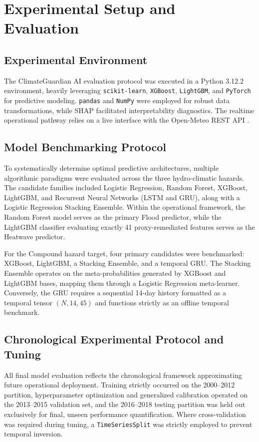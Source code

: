 \section{Experimental Setup and Evaluation}
\label{sec:experimental}

\subsection{Experimental Environment}
The ClimateGuardian AI evaluation protocol was executed in a Python 3.12.2 environment, heavily leveraging \texttt{scikit-learn}, \texttt{XGBoost}, \texttt{LightGBM}, and \texttt{PyTorch} for predictive modeling. \texttt{pandas} and \texttt{NumPy} were employed for robust data transformations, while SHAP \cite{Lundberg2017} facilitated interpretability diagnostics. The realtime operational pathway relies on a live interface with the Open-Meteo REST API \cite{OpenMeteo2023}.

\subsection{Model Benchmarking Protocol}
To systematically determine optimal predictive architectures, multiple algorithmic paradigms were evaluated across the three hydro-climatic hazards. The candidate families included Logistic Regression, Random Forest, XGBoost, LightGBM, and Recurrent Neural Networks (LSTM and GRU), along with a Logistic Regression Stacking Ensemble. Within the operational framework, the Random Forest model serves as the primary Flood predictor, while the LightGBM classifier evaluating exactly 41 proxy-remediated features serves as the Heatwave predictor.

For the Compound hazard target, four primary candidates were benchmarked: XGBoost, LightGBM, a Stacking Ensemble, and a temporal GRU. The Stacking Ensemble operates on the meta-probabilities generated by XGBoost and LightGBM bases, mapping them through a Logistic Regression meta-learner. Conversely, the GRU requires a sequential 14-day history formatted as a temporal tensor $(N, 14, 45)$ and functions strictly as an offline temporal benchmark. 

\subsection{Chronological Experimental Protocol and Tuning}
All final model evaluation reflects the chronological framework approximating future operational deployment. Training strictly occurred on the 2000--2012 partition, hyperparameter optimization and generalized calibration operated on the 2013--2015 validation set, and the 2016--2018 testing partition was held out exclusively for final, unseen performance quantification. Where cross-validation was required during tuning, a \texttt{TimeSeriesSplit} was strictly employed to prevent temporal inversion.

